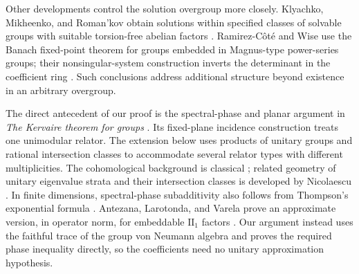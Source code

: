 Other developments control the solution overgroup more closely.
Klyachko, Mikheenko, and Roman'kov obtain solutions within specified
classes of solvable groups with suitable torsion-free abelian factors
\cite{KlyachkoMikheenkoRomankov2024}. Ramirez-C\^ot\'e and Wise use
the Banach fixed-point theorem for groups embedded in Magnus-type
power-series groups; their nonsingular-system construction inverts the
determinant in the coefficient ring
\cite[Theorems~9--10]{RamirezCoteWise2025}. Such conclusions address
additional structure beyond existence in an arbitrary overgroup.

The direct antecedent of our proof is the spectral-phase and planar
argument in \emph{The Kervaire theorem for groups}
\cite[Lemma~2.1, Lemma~3.1, and Theorem~4.1]{OpenAIKervaire2026}.
Its fixed-plane incidence construction treats one unimodular relator.
The extension below uses products of unitary groups and rational
intersection classes to accommodate several relator types with
different multiplicities. The cohomological background is classical
\cite{Borel1953}; related geometry of unitary eigenvalue strata and
their intersection classes is developed by Nicolaescu
\cite{Nicolaescu2010}. In finite dimensions, spectral-phase
subadditivity also follows from Thompson's exponential formula
\cite{Thompson1986}. Antezana, Larotonda, and Varela prove an
approximate version, in operator norm, for embeddable $\mathrm{II}_1$ factors
\cite[Theorem~4.4]{AntezanaLarotondaVarela2012}. Our argument instead
uses the faithful trace of the group von Neumann algebra
\cite[Section~3.3]{Jones2009} and proves the required phase inequality
directly, so the coefficients need no unitary approximation hypothesis.
